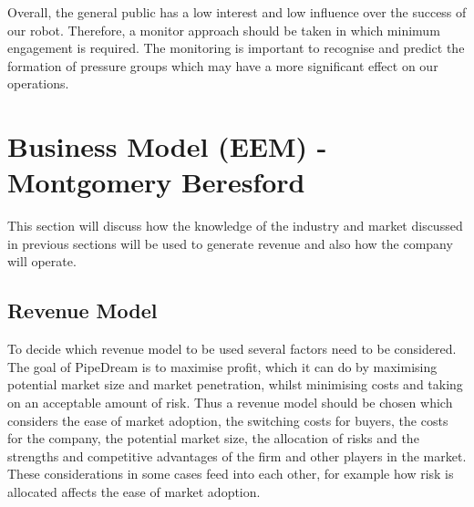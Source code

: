 \documentclass[11pt]{article}		%
\begin{document}
	        Overall, the general public has a low interest and low influence over the success of our robot. Therefore, a monitor approach should be taken in which minimum engagement is required. The monitoring is important to recognise and predict the formation of pressure groups which may have a more significant effect on our operations. 
        	

	\section[Business Model - EEM]{Business Model (EEM) - Montgomery Beresford}
	        
    This section will discuss how the knowledge of the industry and market discussed in previous sections will be used to generate revenue and also how the company will operate.
    
		\subsection{Revenue Model}
        	  To decide which revenue model to be used several factors need to be considered. The goal of PipeDream is to maximise profit, which it can do by maximising potential market size and market penetration, whilst minimising costs and taking on an acceptable amount of risk. Thus a revenue model should be chosen which considers the ease of market adoption, the switching costs for buyers, the costs for the company, the potential market size, the allocation of risks and the strengths and competitive advantages of the firm and other players in the market. These considerations in some cases feed into each other, for example how risk is allocated affects the ease of market adoption.
\end{document}
